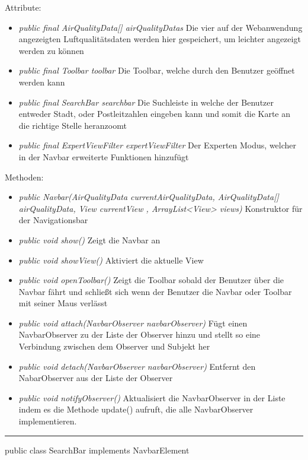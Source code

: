 Attribute:
\begin{itemize}
    \item \emph{public final AirQualityData[] airQualityDatas} Die vier auf der Webanwendung angezeigten Luftqualitätsdaten werden hier gespeichert, um leichter angezeigt werden zu können
    \item \emph{public final Toolbar toolbar} Die Toolbar, welche durch den Benutzer geöffnet werden kann
    \item \emph{public final SearchBar searchbar} Die Suchleiste in welche der Benutzer entweder Stadt, oder Postleitzahlen eingeben kann und somit die Karte an die richtige Stelle heranzoomt
    \item \emph{public final ExpertViewFilter expertViewFilter} Der Experten Modus, welcher in der Navbar erweiterte Funktionen hinzufügt

\end{itemize}
Methoden:
\begin{itemize}
    \item \emph{public Navbar(AirQualityData currentAirQualityData, AirQualityData[] airQualityData, View currentView , ArrayList<View> views)} Konstruktor für der Navigationsbar
    \item \emph{public void show()} Zeigt die Navbar an
    \item \emph{public void showView()} Aktiviert die aktuelle View
    \item \emph{public void openToolbar()} Zeigt die Toolbar sobald der Benutzer über die Navbar fährt und schließt sich wenn der Benutzer die Navbar oder Toolbar mit seiner Maus verlässt
    \item \emph{public void attach(NavbarObserver navbarObserver)} Fügt einen NavbarObserver zu der Liste der Observer hinzu und stellt so eine Verbindung zwischen dem Observer und Subjekt her
    \item \emph{public void detach(NavbarObserver navbarObserver)} Entfernt den NabarObserver aus der Liste der Observer
    \item \emph{public void notifyObserver()} Aktualisiert die NavbarObserver in der Liste indem es die Methode update() aufruft, die alle NavbarObserver implementieren.
\end{itemize}

\rule{\textwidth}{0.4pt}
public class SearchBar implements NavbarElement

